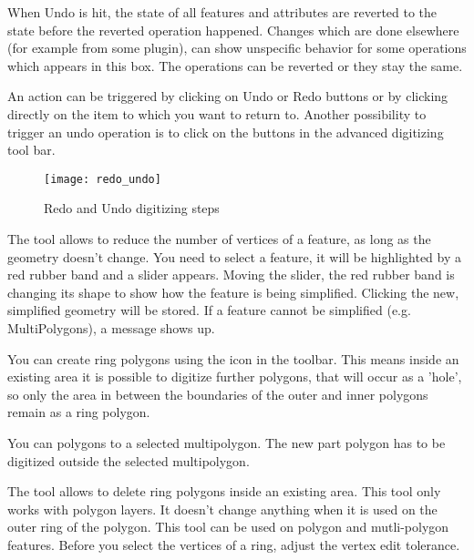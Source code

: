 When Undo is hit, the state of all features and attributes are reverted to the
state before the reverted operation happened. Changes which are done elsewhere
(for example from some plugin), can show unspecific behavior for some operations
which appears in this box. The operations can be reverted or they stay the same.

An action can be triggered by clicking on Undo or Redo buttons or by clicking
directly on the item to which you want to return to. Another possibility to
trigger an undo operation is to click on the  buttons in
the advanced digitizing tool bar.

\begin{figure}[ht]
   \centering
   \texttt{[image: redo\_undo]}
   \caption{Redo and Undo digitizing steps \nixcaption}\label{fig:vector_redoundo}
\end{figure}


The  tool allows to reduce the
number of vertices of a feature, as long as the geometry doesn't change. You
need to select a feature, it will be highlighted by a red rubber band and a
slider appears. Moving the slider, the red rubber band is changing its shape
to show how the feature is being simplified. Clicking  the new,
simplified geometry will be stored. If a feature cannot be simplified (e.g.
MultiPolygons), a message shows up.


You can create ring polygons using the 
icon in the toolbar. This means inside an existing area it is
possible to digitize further polygons, that will occur as a 'hole', so only
the area in between the boundaries of the outer and inner polygons remain as
a ring polygon.


You can  polygons to a selected multipolygon.
The new part polygon has to be digitized outside the selected multipolygon.


The  tool allows to delete ring
polygons inside an existing area. This tool only works with polygon layers.
It doesn't change anything when it is used on the outer ring of the polygon.
This tool can be used on polygon and mutli-polygon features. Before
you select the vertices of a ring, adjust the vertex edit tolerance.

